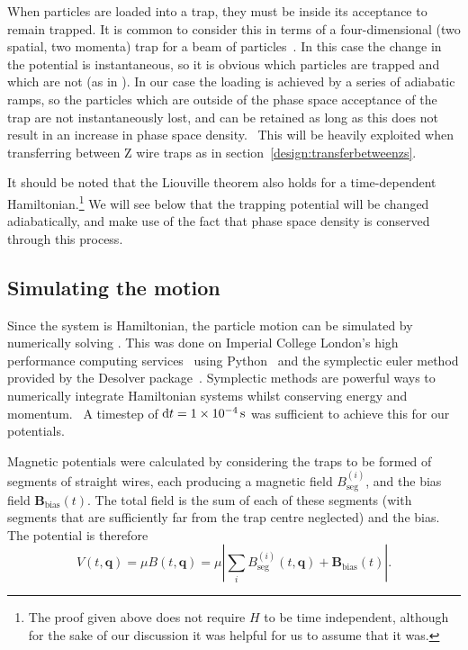 When particles are loaded into a trap, they must be inside its acceptance to
remain trapped. It is common to consider this in terms of a four-dimensional
(two spatial, two momenta) trap for a beam of particles~\cite{Crompvoets2005}.
In this case the change in the potential is instantaneous, so it is obvious
which particles are trapped and which are not (as in
). In our case the loading is achieved by
a series of adiabatic ramps, so the particles which are outside of the phase
space acceptance of the trap are not instantaneously lost, and can be retained
as long as this does not result in an increase in phase space density.~\cite{}
 This will be heavily exploited when
transferring between Z wire traps as in section~\ref{design:transferbetweenzs}.

It should be noted that the Liouville theorem also holds for a time-dependent
Hamiltonian.\footnote{The proof given above does not require $H$ to be time
independent, although for the sake of our discussion it was helpful for us to
assume that it was.} We will see below that the trapping potential will be changed
adiabatically, and make use of the fact that phase space density is conserved
through this process.

\subsection{Simulating the motion}
\label{design:motion:simmethods}


Since the system is Hamiltonian, the particle motion can be simulated by
numerically solving . This was done on Imperial
College London's high performance computing services~\cite{ICRCS} using
Python~\cite{python} and the symplectic euler method provided by the Desolver
package~\cite{desolver}. Symplectic methods are powerful ways to numerically
integrate Hamiltonian systems whilst conserving energy and
momentum.~\cite{Hairer2015, doi:10.1119/1.2034523} A timestep of $\dd t =
\SI{1E-4}{\second}$ was sufficient to achieve this for our potentials.

Magnetic potentials were calculated by considering the traps to be formed of
segments of straight wires, each producing a magnetic field
$B_\text{seg}^{(i)}$, and the bias field $\mathbf{B}_\text{bias}(t)$. The total
field is the sum of each of these segments (with segments that are sufficiently
far from the trap centre neglected) and the bias. The potential is therefore
%
\begin{equation} V(t, \mathbf{q}) = \mu B (t, \mathbf{q}) = \mu \left| \sum_i
B_\text{seg}^{(i)}(t, \mathbf{q}) + \mathbf{B}_\text{bias}(t)\right|.
\end{equation}

